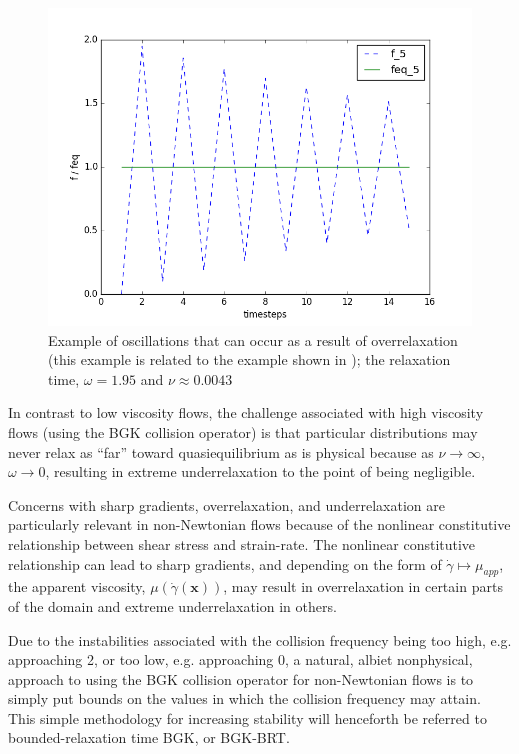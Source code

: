 \documentclass{article}
\newcommand{\pos}{\mathbf{x}}
\begin{document}
\begin{figure}
    \includegraphics[width=\linewidth]{figs/overrelaxation_tau-0513}
    \caption{Example of oscillations that can occur as a result of overrelaxation (this example is related to the example shown in ); the relaxation time, $\omega = 1.95$ and $\nu \approx 0.0043$}
    \label{fig:overrelaxation}
\end{figure}

In contrast to low viscosity flows, the challenge associated with high viscosity flows (using the BGK collision operator) is that particular distributions may never relax as ``far'' toward quasiequilibrium as is physical because as $\nu \rightarrow \infty$, $\omega \rightarrow 0$, resulting in extreme underrelaxation to the point of being negligible. %

Concerns with sharp gradients, overrelaxation, and underrelaxation are particularly relevant in non-Newtonian flows because of the nonlinear constitutive relationship between shear stress and strain-rate.
The nonlinear constitutive relationship can lead to sharp gradients, and depending on the form of $\dot{\gamma} \mapsto \mu_{app}$, the apparent viscosity, $\mu(\dot{\gamma}(\pos))$, may result in overrelaxation in certain parts of the domain and extreme underrelaxation in others.

Due to the instabilities associated with the collision frequency being too high, e.g. approaching 2, or too low, e.g. approaching 0, a natural, albiet nonphysical, approach to using the BGK collision operator for non-Newtonian flows is to simply put bounds on the values in which the collision frequency may attain.
This simple methodology for increasing stability will henceforth be referred to bounded-relaxation time BGK, or BGK-BRT.
\end{document}
